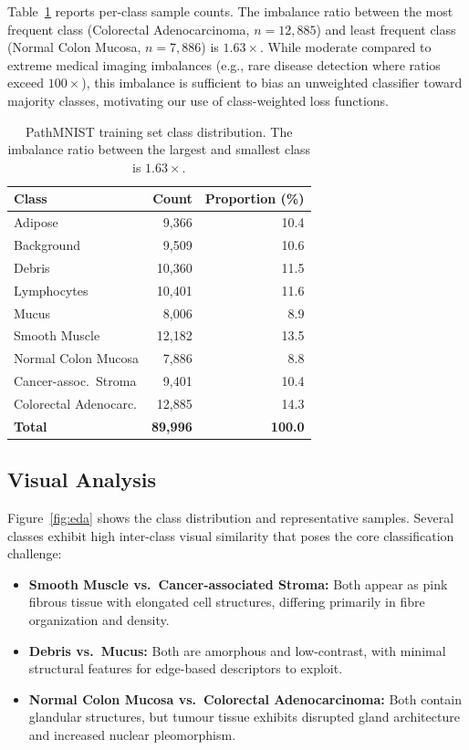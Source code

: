 \documentclass{article}
\begin{document}
Table~\ref{tab:class_dist} reports per-class sample counts. The imbalance ratio between the most frequent class (Colorectal Adenocarcinoma, $n = 12{,}885$) and least frequent class (Normal Colon Mucosa, $n = 7{,}886$) is $\mathbf{1.63\times}$. While moderate compared to extreme medical imaging imbalances (e.g., rare disease detection where ratios exceed $100\times$), this imbalance is sufficient to bias an unweighted classifier toward majority classes, motivating our use of class-weighted loss functions.

\begin{table}[h]
\centering
\caption{PathMNIST training set class distribution. The imbalance ratio between the largest and smallest class is $1.63\times$.}
\label{tab:class_dist}
\begin{tabular}{lrr}
\toprule
Class & Count & Proportion (\%) \\
\midrule
Adipose & 9,366 & 10.4 \\
Background & 9,509 & 10.6 \\
Debris & 10,360 & 11.5 \\
Lymphocytes & 10,401 & 11.6 \\
Mucus & 8,006 & 8.9 \\
Smooth Muscle & 12,182 & 13.5 \\
Normal Colon Mucosa & 7,886 & 8.8 \\
Cancer-assoc.\ Stroma & 9,401 & 10.4 \\
Colorectal Adenocarc. & 12,885 & 14.3 \\
\midrule
\textbf{Total} & \textbf{89,996} & \textbf{100.0} \\
\bottomrule
\end{tabular}
\end{table}

\subsection{Visual Analysis}

Figure~\ref{fig:eda} shows the class distribution and representative samples. Several classes exhibit high inter-class visual similarity that poses the core classification challenge:

\begin{itemize}
    \item \textbf{Smooth Muscle vs.\ Cancer-associated Stroma:} Both appear as pink fibrous tissue with elongated cell structures, differing primarily in fibre organization and density.
    \item \textbf{Debris vs.\ Mucus:} Both are amorphous and low-contrast, with minimal structural features for edge-based descriptors to exploit.
    \item \textbf{Normal Colon Mucosa vs.\ Colorectal Adenocarcinoma:} Both contain glandular structures, but tumour tissue exhibits disrupted gland architecture and increased nuclear pleomorphism.
\end{itemize}
\end{document}
